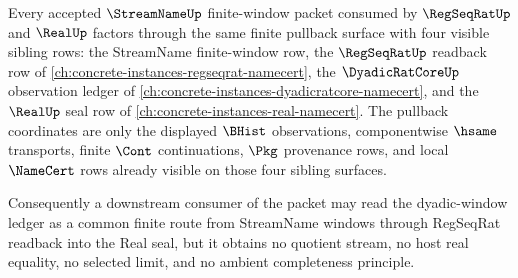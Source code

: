 \begin{theorem}
\label{thm:streamname-regseqrat-real-dyadic-window-pullback}
Every accepted $\StreamNameUp$ finite-window packet consumed by $\RegSeqRatUp$ and $\RealUp$ factors through the same finite pullback surface with four visible sibling rows: the StreamName finite-window row, the $\RegSeqRatUp$ readback row of \autoref{ch:concrete-instances-regseqrat-namecert}, the $\DyadicRatCoreUp$ observation ledger of \autoref{ch:concrete-instances-dyadicratcore-namecert}, and the $\RealUp$ seal row of \autoref{ch:concrete-instances-real-namecert}. The pullback coordinates are only the displayed $\BHist$ observations, componentwise $\hsame$ transports, finite $\Cont$ continuations, $\Pkg$ provenance rows, and local $\NameCert$ rows already visible on those four sibling surfaces.

Consequently a downstream consumer of the packet may read the dyadic-window ledger as a common finite route from StreamName windows through RegSeqRat readback into the Real seal, but it obtains no quotient stream, no host real equality, no selected limit, and no ambient completeness principle.
\end{theorem}
